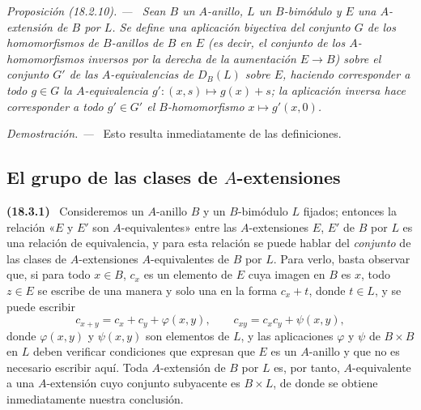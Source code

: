 \documentclass[10pt,oneside]{book}
\makeatletter
\newcommand{\setmanualcurrentlabel}[1]{\def\@currentlabel{#1}}
\newenvironment{env}[1][]{\setmanualcurrentlabel{#1}\par\medskip\noindent\textbf{(#1)}\ }{\par}
\newenvironment{proposition}[1][]{%
  \setmanualcurrentlabel{#1}\par\medskip\noindent\itshape Proposición (#1). ---\ }{\par}
\newenvironment{proof}{%
  \par\medskip\noindent\textit{Demostración. ---\ }}{\par}
\makeatother
\begin{document}
\begin{proposition}[18.2.10]
\label{0.18.2.10-es}
Sean $B$ un $A$-anillo, $L$ un $B$-bimódulo y $E$ una $A$-extensión de $B$
por $L$. Se define una aplicación biyectiva del conjunto $G$ de los
homomorfismos de $B$-anillos de $B$ en $E$ \textup{(es decir, el conjunto de los
$A$-homomorfismos inversos por la derecha de la aumentación $E\to B$)} sobre el
conjunto $G'$ de las $A$-equivalencias de $D_B(L)$ sobre $E$, haciendo
corresponder a todo $g\in G$ la $A$-equivalencia
$g':(x,s)\mapsto g(x)+s$; la aplicación inversa hace corresponder a todo
$g'\in G'$ el $B$-homomorfismo $x\mapsto g'(x,0)$.
\end{proposition}

\begin{proof}
Esto resulta inmediatamente de las definiciones.
\end{proof}

\subsection{El grupo de las clases de $A$-extensiones}
\label{subsection:0.18.3-es}

\begin{env}[18.3.1]
\label{0.18.3.1-es}
Consideremos un $A$-anillo $B$ y un $B$-bimódulo $L$ fijados; entonces la
relación «$E$ y $E'$ son $A$-equivalentes» entre las $A$-extensiones $E$, $E'$
de $B$ por $L$ es una relación de equivalencia, y para esta relación se puede
hablar del \emph{conjunto} de las clases de $A$-extensiones $A$-equivalentes de
$B$ por $L$. Para verlo, basta observar que, si para todo $x\in B$, $c_x$ es
un elemento de $E$ cuya imagen en $B$ es $x$, todo $z\in E$ se escribe de una
manera y solo una en la forma $c_x+t$, donde $t\in L$, y se puede escribir
\[
  c_{x+y}=c_x+c_y+\varphi(x,y),\qquad
  c_{xy}=c_xc_y+\psi(x,y),
\]
donde $\varphi(x,y)$ y $\psi(x,y)$ son elementos de $L$, y las aplicaciones
$\varphi$ y $\psi$ de $B\times B$ en $L$ deben verificar condiciones que
expresan que $E$ es un $A$-anillo y que no es necesario escribir aquí. Toda
$A$-extensión de $B$ por $L$ es, por tanto, $A$-equivalente a una
$A$-extensión cuyo conjunto subyacente es $B\times L$, de donde se obtiene
inmediatamente nuestra conclusión.
\end{env}
\end{document}
